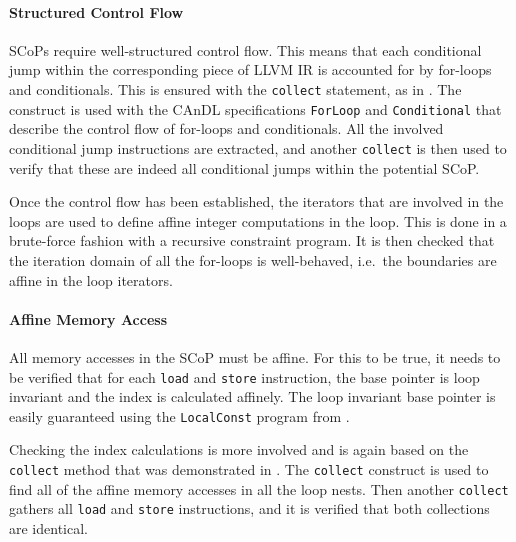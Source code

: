     \paragraph*{Structured Control Flow}
    SCoPs require well-structured control flow.
    This means that each conditional jump within the
    corresponding piece of LLVM IR is accounted for by for-loops and
    conditionals.
    This is ensured with the \texttt{collect} statement, as in
    .
    The construct is used with the CAnDL specifications \texttt{ForLoop} and
    \texttt{Conditional} that describe the control flow of for-loops and
    conditionals.
    All the involved conditional jump instructions are extracted, and  another
    \texttt{collect} is then used to verify that these are indeed all
    conditional jumps within the potential SCoP.

    Once the control flow has been established, the iterators that are
    involved in the loops are used to define affine integer computations in the
    loop.
    This is done in a brute-force fashion with a recursive constraint program.
    It is then checked that the iteration domain of all the for-loops is
    well-behaved, i.e.\ the boundaries are affine in the loop iterators.

    \paragraph*{Affine Memory Access}
    All memory accesses in the SCoP must be affine.
    For this to be true, it needs to be verified that for each {\tt load} and
    {\tt store} instruction, the base pointer is loop invariant and the index is
    calculated affinely.
    The loop invariant base pointer is easily guaranteed using the
    \texttt{LocalConst} program from .

    Checking the index calculations is more involved and is again based on the
    {\tt collect} method that was demonstrated in .
    The {\tt collect} construct is used to find all of the affine memory
    accesses in all the loop nests.
    Then another {\tt collect} gathers all \texttt{load} and \texttt{store}
    instructions, and it is verified that both collections are identical.

